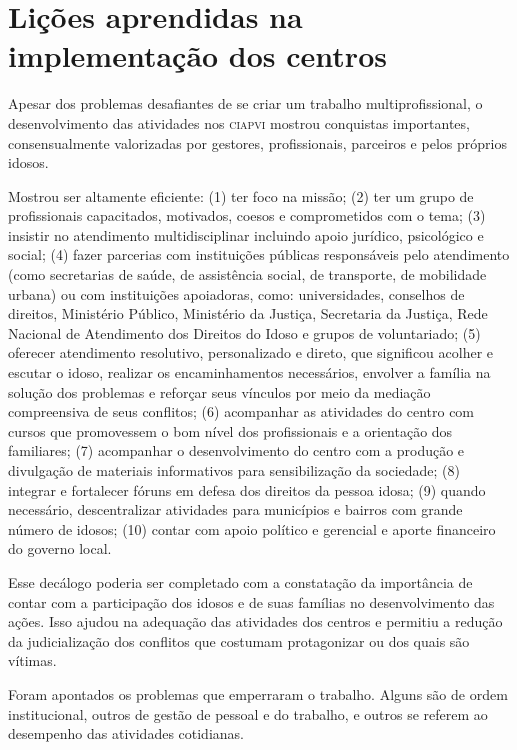 \documentclass{article}
\begin{document}
\section{Lições aprendidas na implementação dos centros}

Apesar dos problemas desafiantes de se criar um trabalho multiprofissional, o
desenvolvimento das atividades nos \textsc{ciapvi} mostrou conquistas importantes,
consensualmente valorizadas por gestores, profissionais, parceiros e pelos
próprios idosos.

Mostrou ser altamente eficiente: (1) ter foco na missão; (2) ter um grupo de
profissionais capacitados, motivados, coesos e comprometidos com o tema; (3)
insistir no atendimento multidisciplinar incluindo apoio jurídico, psicológico e
social; (4) fazer parcerias com instituições públicas responsáveis pelo
atendimento (como secretarias de saúde, de assistência social, de transporte, de
mobilidade urbana) ou com instituições apoiadoras, como: universidades,
conselhos de direitos, Ministério Público, Ministério da Justiça, Secretaria da
Justiça, Rede Nacional de Atendimento dos Direitos do Idoso e grupos de
voluntariado; (5) oferecer atendimento resolutivo, personalizado e direto, que
significou acolher e escutar o idoso, realizar os encaminhamentos necessários,
envolver a família na solução dos problemas e reforçar seus vínculos por meio da
mediação compreensiva de seus conflitos; (6) acompanhar as atividades do centro
com cursos que promovessem o bom nível dos profissionais e a orientação dos
familiares; (7) acompanhar o desenvolvimento do centro com a produção e
divulgação de materiais informativos para sensibilização da sociedade; (8)
integrar e fortalecer fóruns em defesa dos direitos da pessoa idosa; (9) quando
necessário, descentralizar atividades para municípios e bairros com grande
número de idosos; (10) contar com apoio político e gerencial e aporte financeiro
do governo local.

Esse decálogo poderia ser completado com a constatação da importância de contar
com a participação dos idosos e de suas famílias no desenvolvimento das ações.
Isso ajudou na adequação das atividades dos centros e permitiu a redução da
judicialização dos conflitos que costumam protagonizar ou dos quais são vítimas.

Foram apontados os problemas que emperraram o trabalho. Alguns são de ordem
institucional, outros de gestão de pessoal e do trabalho, e outros se referem ao
desempenho das atividades cotidianas.
\end{document}
